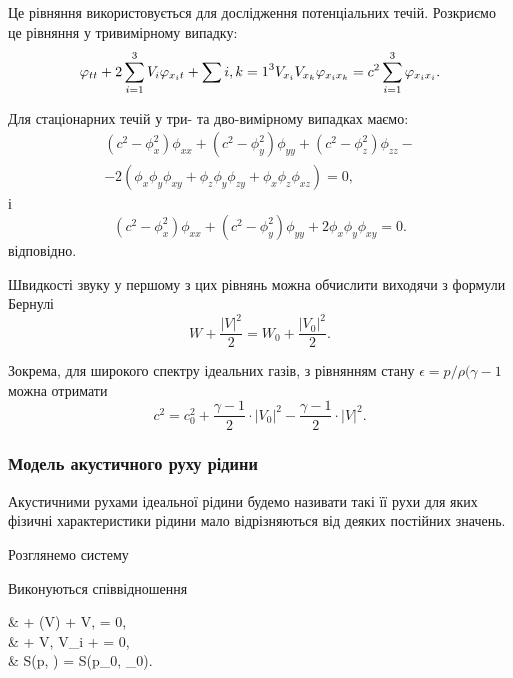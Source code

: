 Це рівняння використовується для дослідження потенціальних течій. Розкриємо це рівняння у тривимірному випадку:
\begin{equation}
	\varphi_{tt} + 2 \displaystyle\sum\limits_{i = 1}^3 V_i \varphi_{x_i t} + \displaystyle\sum\limits{i,k = 1}^3 V_{x_i} V_{x_k} \varphi_{x_i x_k} = c^2 \displaystyle\sum\limits_{i = 1}^3 \varphi_{x_i x_i}.
\end{equation}

Для стаціонарних течій у три- та дво-вимірному випадках маємо:
\begin{multline}
	(c^2 -\phi_x^2)\phi_{xx}+(c^2-\phi_y^2)\phi_{yy}+(c^2-\phi_z^2)\phi_{zz}-\\
	-2(\phi_x\phi_y\phi_{xy}+\phi_z\phi_y\phi_{zy}+\phi_x\phi_z\phi_{xz})=0,
\end{multline}
і
\begin{equation}
	(c^2-\phi_x^2)\phi_{xx}+(c^2-\phi_y^2)\phi_{yy}+2\phi_x\phi_y\phi_{xy}=0.
\end{equation}
відповідно. \medskip

Швидкості звуку у першому з цих рівнянь можна обчислити виходячи з формули Бернулі
\begin{equation}
	W + \frac{|V|^2}{2} = W_0 + \frac{|V_0|^2}{2}.
\end{equation}

Зокрема, для широкого спектру ідеальних газів, з рівнянням стану $\epsilon = p / \rho (\gamma - 1$ можна отримати
\begin{equation}
	c^2 = c_0^2 + \frac{\gamma - 1}{2} \cdot |V_0|^2 - \frac{\gamma - 1}{2} \cdot |V|^2.
\end{equation}

\subsubsection{Модель акустичного руху рідини}

Акустичними рухами ідеальної рідини будемо називати такі її рухи для яких фізичні характеристики рідини мало відрізняються від деяких постійних значень. \medskip

Розглянемо систему
\begin{th_equation}
	Виконуються співвідношення
	\begin{system}
		&  + \rho (\nabla \cdot V) + \langle V, \nabla \rho \rangle = 0, \\
		&  + \langle V, \nabla V_i \rangle +  = 0, \\
		& S(p, \rho) = S(p_0, \rho_0).
	\end{system}
\end{th_equation}

